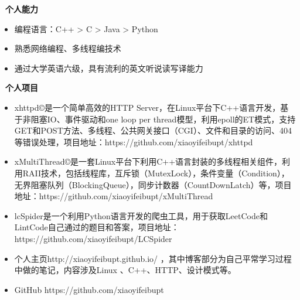 ﻿\documentclass[UTF8, winfonts]{ctexart}
\begin{document}
\noindent \textbf{ \heiti \faCogs\ 个人能力}
\begin{itemize}
  \setlength{\itemsep}{0pt}
  \setlength{\parsep}{3pt}
  \setlength{\parskip}{3pt}
  \item {}编程语言：C++ > C > Java > Python
  \item {}熟悉网络编程、多线程编技术
  \item {}通过大学英语六级，具有流利的英文听说读写译能力
\end{itemize}
\noindent \textbf{ \heiti \faCode\ 个人项目}
\begin{itemize}
  \setlength{\itemsep}{0pt}
  \setlength{\parsep}{3pt}
  \setlength{\parskip}{3pt}
  \item {}xhttpd©是一个简单高效的HTTP Server，在Linux平台下C++语言开发，基于非阻塞IO、事件驱动和one loop per thread模型，利用epoll的ET模式，支持GET和POST方法、多线程、公共网关接口（CGI）、文件和目录的访问、404等错误处理，项目地址：https://github.com/xiaoyifeibupt/xhttpd
  \item {}xMultiThread©是一套Linux平台下利用C++语言封装的多线程相关组件，利用RAII技术，包括线程库，互斥锁（MutexLock），条件变量（Condition），无界阻塞队列（BlockingQueue），同步计数器（CountDownLatch）等，项目地址：https://github.com/xiaoyifeibupt/xMultiThread
  \item {}lcSpider是一个利用Python语言开发的爬虫工具，用于获取LeetCode和LintCode自己通过的题目和答案，项目地址：https://github.com/xiaoyifeibupt/LCSpider
  \item {}个人主页http://xiaoyifeibupt.github.io/ ，其中博客部分为自己平常学习过程中做的笔记，内容涉及Linux 、C++、HTTP、设计模式等。
  \item {}GitHub https://github.com/xiaoyifeibupt
\end{itemize}
\end{document}
